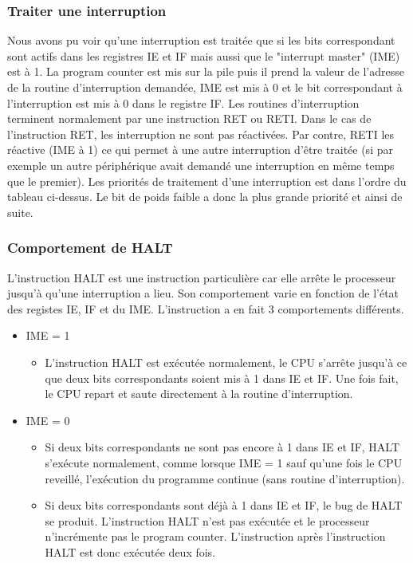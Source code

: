 \documentclass[a4paper]{article}
\begin{document}
\subsubsection{Traiter une interruption}
Nous avons pu voir qu'une interruption est traitée que si les bits correspondant
sont actifs dans les registres IE et IF mais aussi que le "interrupt master" (IME) est
à 1. La program counter est mis sur la pile puis il prend la valeur de l'adresse 
de la routine d'interruption demandée, IME est mis à 0 et le 
bit correspondant à l'interruption est mis à 0 dans le registre IF. Les routines
d'interruption terminent normalement par une instruction RET ou RETI. Dans le cas
de l'instruction RET, les interruption ne sont pas réactivées. Par contre, RETI
les réactive (IME à 1) ce qui permet à une autre interruption d'être
traitée (si par exemple un autre périphérique avait demandé une interruption en même
temps que le premier). Les priorités de traitement d'une interruption est dans l'ordre
du tableau ci-dessus. Le bit de poids faible a donc la plus grande priorité et ainsi
de suite.

\newpage

\subsubsection{Comportement de HALT}
L'instruction HALT est une instruction particulière car elle arrête le processeur
jusqu'à qu'une interruption a lieu. Son comportement varie en fonction de l'état
des registes IE, IF et du IME. L'instruction a en fait 3 comportements
différents.
\begin{itemize}[label=\textbullet]
	\item IME = 1
	\begin{itemize}[label=\textbullet]
		\item L'instruction HALT est exécutée normalement, le CPU s'arrête jusqu'à
		ce que deux bits correspondants soient mis à 1 dans IE et IF. Une fois fait,
		le CPU repart et saute directement à la routine d'interruption.
	\end{itemize}
	\item IME = 0
	\begin{itemize}[label=\textbullet]
		\item Si deux bits correspondants ne sont pas encore à 1 dans IE et IF, HALT 
		s'exécute normalement, comme lorsque IME = 1 sauf qu'une fois le CPU reveillé,
		l'exécution du programme continue (sans routine d'interruption).
		\item Si deux bits correspondants sont déjà à 1 dans IE et IF, le bug de HALT
		se produit. L'instruction HALT n'est pas exécutée et le processeur n'incrémente
		pas le program counter. L'instruction après l'instruction HALT est donc exécutée
		deux fois.
	\end{itemize}
\end{itemize}
\end{document}
